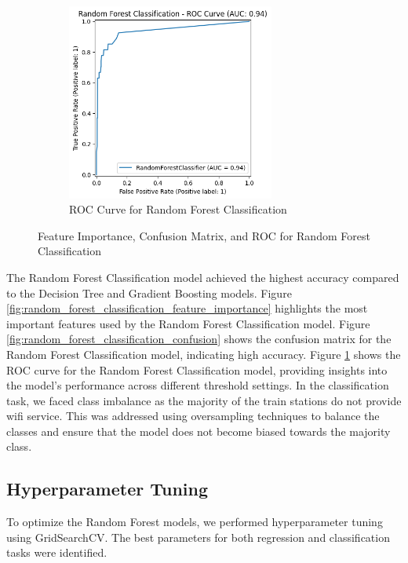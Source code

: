 \begin{figure}[H]
    \hfill
    \begin{subfigure}[b]{0.3\textwidth}
        \centering
        \includegraphics[width=0.75\textwidth]{assets/images/random_forest_ROC.png}
        \caption{ROC Curve for Random Forest Classification}
        \label{fig:random_forest_classification_ROC}
    \end{subfigure}
    \caption{Feature Importance, Confusion Matrix, and ROC for Random Forest Classification}
    \label{fig:classification_performance_and_confusion}
\end{figure}

The Random Forest Classification model achieved the highest accuracy compared to the Decision Tree and Gradient Boosting models. Figure \ref{fig:random_forest_classification_feature_importance} highlights the most important features used by the Random Forest Classification model. Figure \ref{fig:random_forest_classification_confusion} shows the confusion matrix for the Random Forest Classification model, indicating high accuracy. Figure \ref{fig:random_forest_classification_ROC} shows the ROC curve for the Random Forest Classification model, providing insights into the model's performance across different threshold settings. In the classification task, we faced class imbalance as the majority of the train stations do not provide wifi service. This was addressed using oversampling techniques to balance the classes and ensure that the model does not become biased towards the majority class.

\subsection{Hyperparameter Tuning}
To optimize the Random Forest models, we performed hyperparameter tuning using GridSearchCV. The best parameters for both regression and classification tasks were identified.

